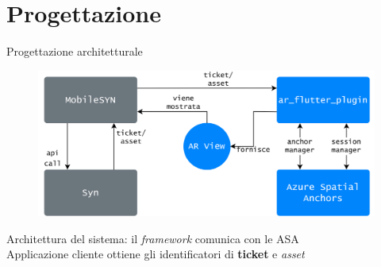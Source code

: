 \documentclass{beamer}
\begin{document}

\section{Progettazione}
\begin{frame}{Progettazione architetturale}
 \begin{figure}[H]
    \centering
    \includegraphics[width=\textwidth]{immagini/architettura.png}
\end{figure}
\centering
Architettura del sistema: il \textit{framework} comunica con le ASA\\ \vspace{.5em}
Applicazione cliente ottiene gli identificatori di \textbf{ticket} e \textit{asset} 
\end{frame}

\end{document}
